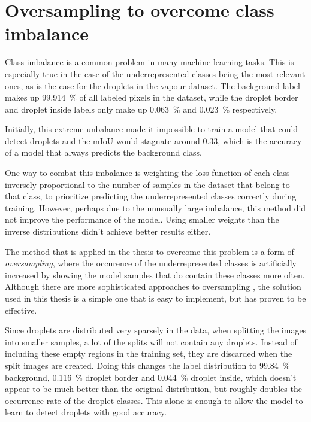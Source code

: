 \section{Oversampling to overcome class imbalance}
\label{sec:oversampling}

Class imbalance is a common problem in many machine learning tasks.
This is especially true in the case of the underrepresented classes being the most relevant ones, as is the case for the droplets in the vapour dataset.
The background label makes up \SI{99.914}{\percent} of all labeled pixels in the dataset, while the droplet border and droplet inside labels only make up \SI{0.063}{\percent} and \SI{0.023}{\percent} respectively.

Initially, this extreme unbalance made it impossible to train a model that could detect droplets and the mIoU would stagnate around \num{0.33}, which is the accuracy of a model that always predicts the background class.

One way to combat this imbalance is weighting the loss function of each class inversely proportional to the number of samples in the dataset that belong to that class, to prioritize predicting the underrepresented classes correctly during training. 
However, perhaps due to the unusually large imbalance, this method did not improve the performance of the model. Using smaller weights than the inverse distributions didn't achieve better results either.

The method that is applied in the thesis to overcome this problem is a form of \emph{oversampling}\cite{mohammedMachineLearningOversampling2020}, where the occurence of the underrepresented classes is artificially increased by showing the model samples that do contain these classes more often.
Although there are more sophisticated approaches to oversampling \cite{ReviewImbalancedData2017}, the solution used in this thesis is a simple one that is easy to implement, but has proven to be effective.

Since droplets are distributed very sparsely in the data, when splitting the images into smaller samples, a lot of the splits will not contain any droplets. 
Instead of including these empty regions in the training set, they are discarded when the split images are created.
Doing this changes the label distribution to \SI{99.84}{\percent} background, \SI{
0.116}{\percent} droplet border and \SI{0.044}{\percent} droplet inside, which doesn't appear to be much better than the original distribution, but roughly doubles the occurrence rate of the droplet classes. 
This alone is enough to allow the model to learn to detect droplets with good accuracy.

